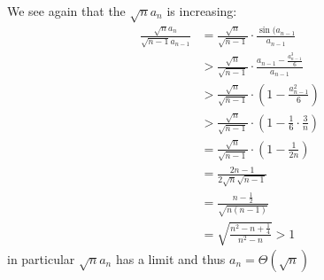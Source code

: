 \documentclass{article}
\begin{document}
We see again that the $\sqrt{n}a_n$ is increasing:
\begin{align*}
	\frac{\sqrt{n}a_n}{\sqrt{n-1}a_{n-1}} &= \frac{\sqrt{n}}{\sqrt{n-1}} \cdot \frac{\sin(a_{n-1}}{a_{n-1}} \\
	&> \frac{\sqrt{n}}{\sqrt{n-1}} \cdot \frac{a_{n-1} - \frac{a_{n-1}^3}{6}}{a_{n-1}}\\
	&> \frac{\sqrt{n}}{\sqrt{n-1}} \cdot (1 - \frac{a_{n-1}^2}{6}) \\
	&> \frac{\sqrt{n}}{\sqrt{n-1}} \cdot (1 - \frac{1}{6}\cdot\frac{3}{n})\\
	&= \frac{\sqrt{n}}{\sqrt{n-1}} \cdot (1 - \frac{1}{2n})\\
	&= \frac{2n-1}{2\sqrt{n}\sqrt{n-1}}\\
	&= \frac{n-\frac{1}{2}}{\sqrt{n(n-1)}}\\
	&= \sqrt{\frac{n^2 - n + \frac{1}{4}}{n^2-n}} > 1
\end{align*}
in particular $\sqrt{n}a_n$ has a limit and thus $a_n = \Theta(\sqrt{n})$
\end{document}
